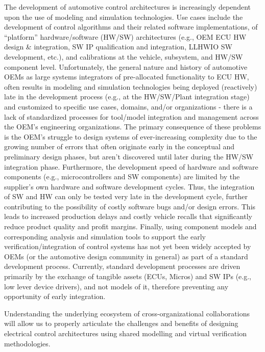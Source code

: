 The development of automotive control architectures is increasingly dependent upon the use of modeling and simulation technologies. Use cases include the development of control algorithms and their related software implementations, of “platform” hardware/software (HW/SW) architectures (e.g., OEM ECU HW design & integration, SW IP qualification and integration, LLHWIO SW development, etc.), and calibrations at the vehicle, subsystem, and HW/SW component level. Unfortunately, the general nature and history of automotive OEMs as large systems integrators of pre-allocated functionality to ECU HW, often results in modeling and simulation technologies being deployed (reactively) late in the development process (e.g., at the HW/SW/Plant integration stage) and customized to specific use cases, domains, and/or organizations - there is a lack of standardized processes for tool/model integration and management across the OEM’s engineering organizations.  The primary consequence of these problems is the OEM’s struggle to design systems of ever-increasing complexity due to the growing number of errors that often originate early in the conceptual and preliminary design phases, but aren’t discovered until later during the HW/SW integration phase. Furthermore, the development speed of hardware and software components (e.g., microcontrollers and SW components) are limited by the supplier’s own hardware and software development cycles. Thus, the integration of SW and HW can only be tested very late in the development cycle, further contributing to the possibility of costly software bugs and/or design errors.  This leads to increased production delays and costly vehicle recalls that significantly reduce product quality and profit margins. Finally, using component models and corresponding analysis and simulation tools to support the early verification/integration of control systems has not yet been widely accepted by OEMs (or the automotive design community in general) as part of a standard development process. Currently, standard development processes are driven primarily by the exchange of tangible assets (ECUs, Micros) and SW IPs (e.g., low lever device drivers), and not models of it, therefore preventing any opportunity of early integration.

Understanding the underlying ecosystem of cross-organizational collaborations will allow us to properly articulate the challenges and benefits of designing electrical control architectures using shared modelling and virtual verification methodologies.

